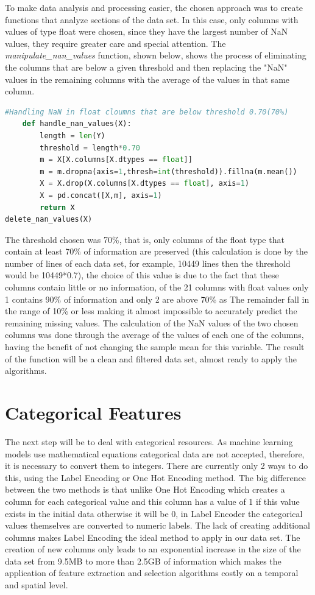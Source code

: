To make data analysis and processing easier, the chosen approach was to create functions that analyze sections of the data set. In this case, only columns with values of type float were chosen, since they have the largest number of NaN values, they require greater care and special attention. The \textit{manipulate\_nan\_values} function, shown below, shows the process of eliminating the columns that are below a given threshold and then replacing the "NaN" values in the remaining columns with the average of the values in that same column.

\begin{lstlisting}[language=Python]
#Handling NaN in float cloumns that are below threshold 0.70(70%)
    def handle_nan_values(X):
        length = len(Y)
        threshold = length*0.70
        m = X[X.columns[X.dtypes == float]]
        m = m.dropna(axis=1,thresh=int(threshold)).fillna(m.mean())
        X = X.drop(X.columns[X.dtypes == float], axis=1)
        X = pd.concat([X,m], axis=1)
        return X
delete_nan_values(X)
\end{lstlisting}

The threshold chosen was 70\%, that is, only columns of the float type that contain at least 70\% of information are preserved (this calculation is done by the number of lines of each data set, for example, 10449 lines then the threshold would be 10449*0.7), the choice of this value is due to the fact that these columns contain little or no information, of the 21 columns with float values only 1 contains 90\% of information and only 2 are above 70\% as The remainder fall in the range of 10\% or less making it almost impossible to accurately predict the remaining missing values. The calculation of the NaN values of the two chosen columns was done through the average of the values of each one of the columns, having the benefit of not changing the sample mean for this variable. The result of the function will be a clean and filtered data set, almost ready to apply the algorithms.

\section{Categorical Features} %
\label{sec:dealing_with_bibliography}
\hspace{10px}The next step will be to deal with categorical resources. As machine learning models use mathematical equations categorical data are not accepted, therefore, it is necessary to convert them to integers. There are currently only 2 ways to do this, using the Label Encoding or One Hot Encoding method. The big difference between the two methods is that unlike One Hot Encoding which creates a column for each categorical value and this column has a value of 1 if this value exists in the initial data otherwise it will be 0, in Label Encoder the categorical values themselves are converted to numeric labels.
The lack of creating additional columns makes Label Encoding the ideal method to apply in our data set. The creation of new columns only leads to an exponential increase in the size of the data set from 9.5MB to more than 2.5GB of information which makes the application of feature extraction and selection algorithms costly on a temporal and spatial level.

